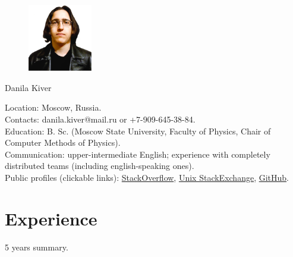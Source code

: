 \documentclass[letterpaper, 11pt]{article}
\begin{document}
    \begin{figure}
        \centering
        \vspace{-5pt}
        \includegraphics[width=0.25\textwidth]{src/images/pho_small_cut.png}
    \end{figure}

    \noindent
    \Huge
    Danila Kiver \\
    \normalsize

    \noindent
    Location: Moscow, Russia. \\

    \noindent
    Contacts: danila.kiver@mail.ru or +7-909-645-38-84. \\

    \noindent
    Education: B. Sc. (Moscow State University, Faculty of Physics, Chair of Computer Methods of Physics). \\

    \noindent
    Communication: upper-intermediate English; experience with completely distributed teams (including english-speaking ones). \\

    \noindent
    Public profiles (clickable links): \href{https://stackoverflow.com/users/7191047/danila-kiver}{StackOverflow}, \href{https://unix.stackexchange.com/users/297621/danila-kiver}{Unix StackExchange}, \href{https://github.com/QazerLab}{GitHub}.





    \section{Experience}

    5 years summary.
\end{document}

